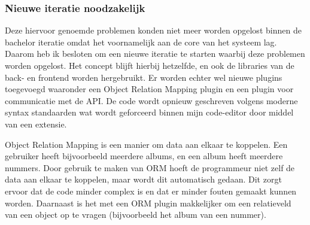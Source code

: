 \subsubsection*{Nieuwe iteratie noodzakelijk}
Deze hiervoor genoemde problemen konden niet meer worden opgelost binnen de bachelor iteratie omdat het voornamelijk aan de core van het systeem lag. Daarom heb ik besloten om een nieuwe iteratie te starten waarbij deze problemen worden opgelost. Het concept blijft hierbij hetzelfde, en ook de libraries van de back- en frontend worden hergebruikt. Er worden echter wel nieuwe plugins toegevoegd waaronder een Object Relation Mapping plugin en een plugin voor communicatie met de API. De code wordt opnieuw geschreven volgens moderne syntax standaarden wat wordt geforceerd binnen mijn code-editor door middel van een extensie.

Object Relation Mapping is een manier om data aan elkaar te koppelen. Een gebruiker heeft bijvoorbeeld meerdere albums, en een album heeft meerdere nummers. Door gebruik te maken van ORM hoeft de programmeur niet zelf de data aan elkaar te koppelen, maar wordt dit automatisch gedaan. Dit zorgt ervoor dat de code minder complex is en dat er minder fouten gemaakt kunnen worden. Daarnaast is het met een ORM plugin makkelijker om een relatieveld van een object op te vragen (bijvoorbeeld het album van een nummer).
